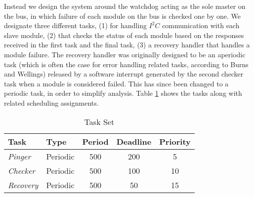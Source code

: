 Instead we design the system around the watchdog acting as the sole master on the bus, in which failure of each module on the bus is checked one by one. We designate three different tasks, (1) for handling $\textit{I}^2\textit{C}$ communication with each slave module, (2) that checks the status of each module based on the responses received in the first task and the final task, (3) a recovery handler that handles a module failure. The recovery handler was originally designed to be an aperiodic task (which is often the case for error handling related tasks, according to Burns and Wellings) released by a software interrupt generated by the second checker task when a module is considered failed. This has since been changed to a periodic task, in order to simplify analysis. Table \ref{tab:taskslol} shows the tasks along with related scheduling assignments.
\begin{table}
\centering
\begin{tabular}{ | l | l | c | c | c |}
\hline
Task & Type & Period & Deadline & Priority  \\ \hline
\textit{Pinger} & Periodic & 500 & 200 & 5  \\ \hline
\textit{Checker} & Periodic & 500 & 100 & 10 \\ \hline
\textit{Recovery} & Periodic & 500 & 50 &  15 \\
\hline
\end{tabular}
 \caption{Task Set}
 \label{tab:taskslol}
\end{table}

